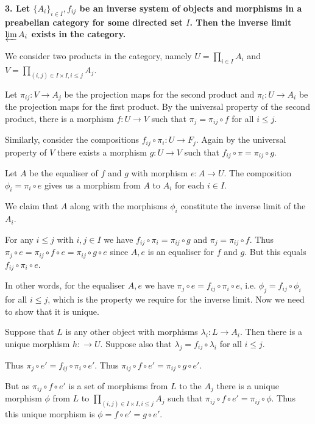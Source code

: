 \documentclass[12pt]{article}
\begin{document}
\textbf{3. Let $\{A_i\}_{i\in I}, f_{ij}$ be an inverse system of objects and morphisms in a preabelian category for some directed set $I$. Then the inverse limit $\varprojlim A_i$ exists in the category.}

We consider two products in the category, namely $U = \prod_{i \in I} A_i$ and $V = \prod_{(i, j)\in I\times I, i \leq j} A_j$.

Let $\pi_{ij} : V \to A_j$ be the projection maps for the second product and $\pi_i : U \to A_i$ be the projection maps for the first product. By the universal property of the second product, there is a morphism $f : U \to V$ such that $\pi_j = \pi_{ij}\circ f$ for all $i \leq j$.

Similarly, consider the compositions $f_{ij}\circ \pi_i : U \to F_j$. Again by the universal property of $V$ there exists a morphism $g : U \to V$ such that $f_{ij}\circ \pi = \pi_{ij}\circ g$.

Let $A$ be the equaliser of $f$ and $g$ with morphism $e : A \to U$. The composition $\phi_i = \pi_i\circ e$ gives us a morphism from $A$ to $A_i$ for each $i \in I$.

We claim that $A$ along with the morphisms $\phi_i$ constitute the inverse limit of the $A_i$.

For any $i \leq j$ with $i, j \in I$ we have $f_{ij}\circ \pi_i = \pi_{ij}\circ g$ and $\pi_j = \pi_{ij}\circ f$. Thus $\pi_j\circ e = \pi_{ij}\circ f\circ e = \pi_{ij}\circ g\circ e$ since $A, e$ is an equaliser for $f$ and $g$. But this equals $f_{ij}\circ \pi_i\circ e$.

In other words, for the equaliser $A, e$ we have $\pi_j\circ e = f_{ij}\circ \pi_i\circ e$, i.e. $\phi_j = f_{ij}\circ \phi_i$ for all $i \leq j$, which is the property we require for the inverse limit. Now we need to show that it is unique.

Suppose that $L$ is any other object with morphisms $\lambda_i : L \to A_i$. Then there is a unique morphism $h : \to U$. Suppose also that $\lambda_j = f_{ij}\circ \lambda_i$ for all $i \leq j$.

Thus $\pi_j\circ e' = f_{ij}\circ \pi_i\circ e'$. Thus $\pi_{ij}\circ f\circ e' = \pi_{ij}\circ g\circ e'$.

But as $\pi_{ij}\circ f\circ e'$ is a set of morphisms from $L$ to the $A_j$ there is a unique morphism $\phi$ from $L$ to $\prod_{(i, j)\in I\times I, i \leq j} A_j$ such that $\pi_{ij}\circ f\circ e' = \pi_{ij}\circ \phi$. Thus this unique morphism is $\phi = f\circ e' = g\circ e'$.
\end{document}

